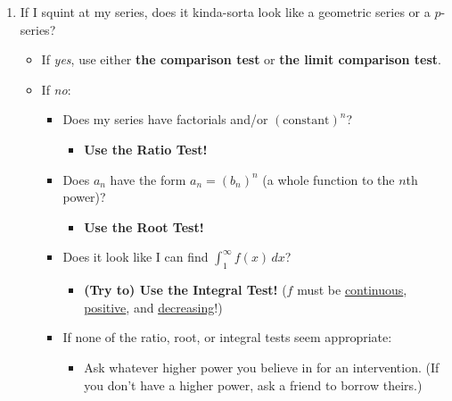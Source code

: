 \documentclass[10pt]{article}
\newcommand{\infsum}[3]{\sum_{{#1}={#2}}^\infty {#3}}
\begin{document}
\begin{enumerate}
		\item If I squint at my series, does it kinda-sorta look like a geometric series or a $p$-series?
			\begin{itemize}
				\item If \textit{yes}, use either \textbf{the comparison test} or \textbf{the limit comparison test}. 
				\item If \textit{no}:
				\begin{itemize}
					\item Does my series have factorials and/or $(\text{constant})^n$? 
						\begin{itemize}
							\item \textbf{Use the Ratio Test!}
						\end{itemize}
					\item Does $a_n$ have the form $a_n=(b_n)^n$ ({\footnotesize{a whole function to the $n$th power}})? 
						\begin{itemize}
							\item \textbf{Use the Root Test!}
						\end{itemize}
					\item Does it look like I can find $\textstyle\int_1^\infty f(x)\,dx$? 
						\begin{itemize}
							\item \textbf{(Try to) Use the Integral Test!} ({\footnotesize{$f$ must be \ul{continuous}, \ul{positive}, and \ul{decreasing}!}})
						\end{itemize}
					\item If none of the ratio, root, or integral tests seem appropriate: 
					\begin{itemize}
						\item Ask whatever higher power you believe in for an intervention. ({\footnotesize{If you don't have a higher power, ask a friend to borrow theirs.}})

\end{itemize}
\end{itemize}
\end{itemize}
\end{enumerate}
\end{document}
